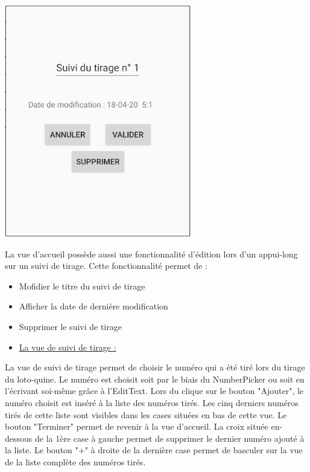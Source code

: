\documentclass{article}
\begin{document}
    \begin{minipage}{.35\textwidth}%
        \includegraphics[scale=0.6]{edition.png}
    \end{minipage}%
    \hfill
    \begin{minipage}{.6\textwidth}%
    La vue d'accueil possède aussi une fonctionnalité d'édition lors d'un appui-long sur un suivi de tirage. Cette fonctionnalité permet de :
    \vspace{1em}
    \begin{itemize}
        \item Mofidier le titre du suivi de tirage
        \item Afficher la date de dernière modification
        \item Supprimer le suivi de tirage
    \end{itemize}
    \end{minipage}%
\vspace{4em}
\begin{itemize}
    \item {\underline{\large{La vue de suivi de tirage :}}}
\end{itemize}
\vspace{1em}
    \begin{minipage}{.6\textwidth}%
    La vue de suivi de tirage permet de choisir le numéro qui a été tiré lors du tirage du loto-quine. Le numéro est choisit soit par le biais du NumberPicker ou soit en l'écrivant soi-même grâce à l'EditText.
    \vspace{1em}
    \newline
    Lors du clique sur le bouton "Ajouter", le numéro choisit est inséré à la liste des numéros tirés. Les cinq derniers numéros tirés de cette liste sont visibles dans les cases situées en bas de cette vue.
    Le bouton "Terminer" permet de revenir à la vue d'accueil.
    \vspace{1em}
    \newline
    La croix située en-dessous de la 1ère case à gauche permet de supprimer le dernier numéro ajouté à la liste.
    \newline
    Le bouton "+" à droite de la dernière case permet de basculer sur la vue de la liste complète des numéros tirés. 
    \end{minipage}%
\end{document}
